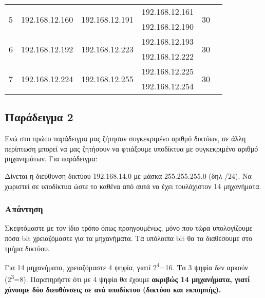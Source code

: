 \begin{center}
\begin{tabular}{|c|c|c|c|c|c|c|}
\multirow{2}{*}{5} & \multirow{2}{*}{192.168.12.160} & \multirow{2}{*}{192.168.12.191} & \multicolumn{2}{l|}{192.168.12.161} & \multirow{2}{*}{30} \\ \cline{4-5}
                  &                   &                   & \multicolumn{2}{l|}{192.168.12.190} &                   \\ \hline
\multirow{2}{*}{6} & \multirow{2}{*}{192.168.12.192} & \multirow{2}{*}{192.168.12.223} & \multicolumn{2}{l|}{192.168.12.193} & \multirow{2}{*}{30} \\ \cline{4-5}
                  &                   &                   & \multicolumn{2}{l|}{192.168.12.222} &                   \\ \hline
\multirow{2}{*}{7} & \multirow{2}{*}{192.168.12.224} & \multirow{2}{*}{192.168.12.255} & \multicolumn{2}{l|}{192.168.12.225} & \multirow{2}{*}{30} \\ \cline{4-5}
                  &                   &                   & \multicolumn{2}{l|}{192.168.12.254} &                   \\ \hline
\end{tabular}
\normalfont
\end{center}

\subsection*{Παράδειγμα 2}

Ενώ στο πρώτο παράδειγμα μας ζήτησαν συγκεκριμένο αριθμό δικτύων, σε άλλη περίπτωση μπορεί να μας ζητήσουν να φτιάξουμε υποδίκτυα με συγκεκριμένο αριθμό μηχανημάτων. Για παράδειγμα:

Δίνεται η διεύθυνση δικτύου 192.168.14.0 με μάσκα 255.255.255.0 (δηλ /24). Να χωριστεί σε υποδίκτυα ώστε το καθένα από αυτά να έχει τουλάχιστον 14 μηχανήματα. 

\subsubsection*{Απάντηση}

Σκεφτόμαστε με τον ίδιο τρόπο όπως προηγουμένως, μόνο που τώρα υπολογίζουμε πόσα bit χρειαζόμαστε για τα μηχανήματα. Τα υπόλοιπα bit θα τα διαθέσουμε στο τμήμα δικτύου.

Για 14 μηχανήματα, χρειαζόμαστε 4 ψηφία, γιατί 2\textsuperscript{4}=16. Τα 3 ψηφία δεν αρκούν (2\textsuperscript{3}=8). Παρατηρήστε ότι με 4 ψηφία θα έχουμε \textbf{ακριβώς 14 μηχανήματα, γιατί χάνουμε δύο διευθύνσεις σε ανά υποδίκτυο (δικτύου και εκπομπής).}
 
